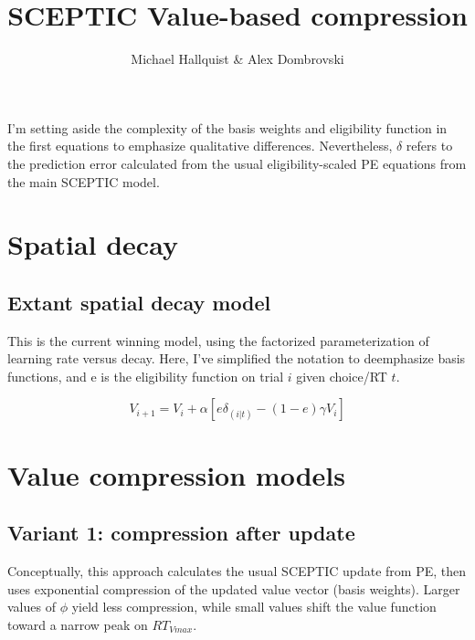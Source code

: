\documentclass[11pt]{amsart}
\title{SCEPTIC Value-based compression}
\author{Michael Hallquist \& Alex Dombrovski}
\begin{document}
\maketitle

I'm setting aside the complexity of the basis weights and eligibility function in the first equations to emphasize qualitative differences. Nevertheless,
$\delta$ refers to the prediction error calculated from the usual eligibility-scaled PE equations from the main SCEPTIC model.

\section{Spatial decay}
\subsection{Extant spatial decay model}

This is the current winning model, using the factorized parameterization of learning rate versus decay. Here, I've simplified the notation to deemphasize basis functions, and e
is the eligibility function on trial $i$ given choice/RT $t$.

\begin{equation}
V_{i+1} = V_{i} + \alpha [ e \delta_{(i | t)}  - (1-e) \gamma V_{i} ]
\end{equation}

\section{Value compression models}

\subsection{Variant 1: compression after update}

Conceptually, this approach calculates the usual SCEPTIC update from PE, then uses exponential compression of the updated value vector (basis weights).
Larger values of $\phi$ yield less compression, while small values shift the value function toward a narrow peak on $RT_{Vmax}$.
\end{document}
